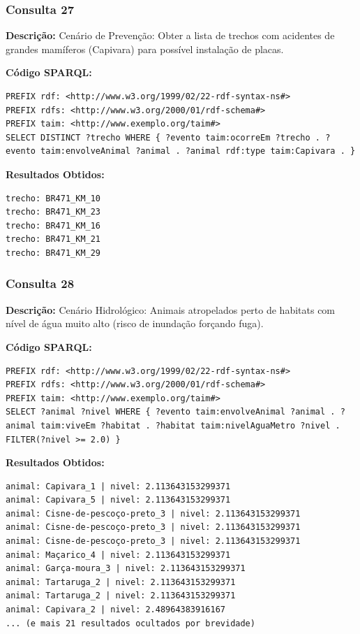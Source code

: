 \documentclass[12pt,a4paper]{article}
\begin{document}
\vspace{1cm}
\subsubsection*{Consulta 27}

\textbf{Descrição:} Cenário de Prevenção: Obter a lista de trechos com acidentes de grandes mamíferos (Capivara) para possível instalação de placas.

\textbf{Código SPARQL:}
\begin{lstlisting}
PREFIX rdf: <http://www.w3.org/1999/02/22-rdf-syntax-ns#>
PREFIX rdfs: <http://www.w3.org/2000/01/rdf-schema#>
PREFIX taim: <http://www.exemplo.org/taim#>
SELECT DISTINCT ?trecho WHERE { ?evento taim:ocorreEm ?trecho . ?evento taim:envolveAnimal ?animal . ?animal rdf:type taim:Capivara . }
\end{lstlisting}

\textbf{Resultados Obtidos:}
\begin{lstlisting}
trecho: BR471_KM_10
trecho: BR471_KM_23
trecho: BR471_KM_16
trecho: BR471_KM_21
trecho: BR471_KM_29
\end{lstlisting}

\vspace{1cm}
\subsubsection*{Consulta 28}

\textbf{Descrição:} Cenário Hidrológico: Animais atropelados perto de habitats com nível de água muito alto (risco de inundação forçando fuga).

\textbf{Código SPARQL:}
\begin{lstlisting}
PREFIX rdf: <http://www.w3.org/1999/02/22-rdf-syntax-ns#>
PREFIX rdfs: <http://www.w3.org/2000/01/rdf-schema#>
PREFIX taim: <http://www.exemplo.org/taim#>
SELECT ?animal ?nivel WHERE { ?evento taim:envolveAnimal ?animal . ?animal taim:viveEm ?habitat . ?habitat taim:nivelAguaMetro ?nivel . FILTER(?nivel >= 2.0) }
\end{lstlisting}

\textbf{Resultados Obtidos:}
\begin{lstlisting}
animal: Capivara_1 | nivel: 2.113643153299371
animal: Capivara_5 | nivel: 2.113643153299371
animal: Cisne-de-pescoço-preto_3 | nivel: 2.113643153299371
animal: Cisne-de-pescoço-preto_3 | nivel: 2.113643153299371
animal: Cisne-de-pescoço-preto_3 | nivel: 2.113643153299371
animal: Maçarico_4 | nivel: 2.113643153299371
animal: Garça-moura_3 | nivel: 2.113643153299371
animal: Tartaruga_2 | nivel: 2.113643153299371
animal: Tartaruga_2 | nivel: 2.113643153299371
animal: Capivara_2 | nivel: 2.48964383916167
... (e mais 21 resultados ocultados por brevidade)
\end{lstlisting}
\end{document}
